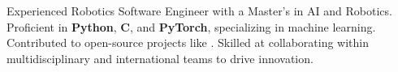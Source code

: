   \item{Experienced Robotics Software Engineer with a Master's in AI and Robotics. Proficient in \textbf{Python}, \textbf{C}, and \textbf{PyTorch}, specializing in machine learning. Contributed to open-source projects like . Skilled at collaborating within multidisciplinary and international teams to drive innovation.}
  \resumeSubHeadingListEnd
